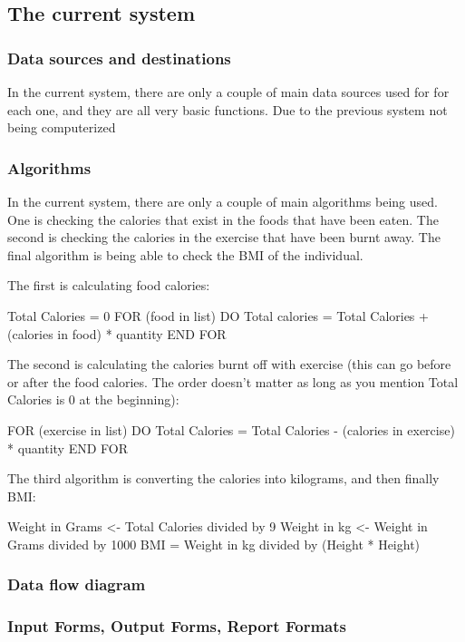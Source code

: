 \subsection{The current system}

\subsubsection{Data sources and destinations}
In the current system, there are only a couple of main data sources used for for each one, and they are all very basic functions. Due to the previous system not being computerized

\subsubsection{Algorithms}
In the current system, there are only a couple of main algorithms being used. One is checking the calories that exist in the foods that have been eaten. The second is checking the calories in the exercise that have been burnt away. The final algorithm is being able to check the BMI of the individual.

The first is calculating food calories:

Total Calories = 0
FOR (food in list) DO
	Total calories = Total Calories + (calories in food) * quantity
END FOR

The second is calculating the calories burnt off with exercise (this can go before or after the food calories. The order doesn't matter as long as you mention Total Calories is 0 at the beginning):

FOR (exercise in list) DO
	Total Calories = Total Calories - (calories in exercise) * quantity
END FOR

The third algorithm is converting the calories into kilograms, and then finally BMI:

Weight in Grams <- Total Calories divided by 9
Weight in kg <- Weight in Grams divided by 1000
BMI = Weight in kg divided by (Height * Height)

\subsubsection{Data flow diagram}

\subsubsection{Input Forms, Output Forms, Report Formats}

